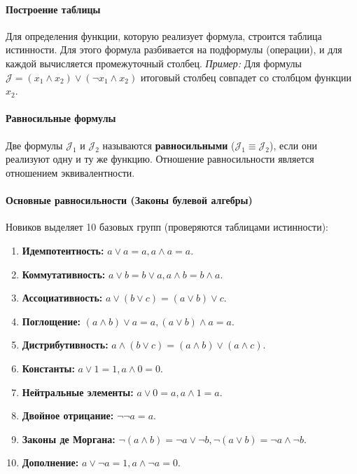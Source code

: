 \paragraph{Построение таблицы}
Для определения функции, которую реализует формула, строится таблица истинности. Для этого формула разбивается на подформулы (операции), и для каждой вычисляется промежуточный столбец.
\textit{Пример:} Для формулы $\mathcal{J} = (x_1 \land x_2) \lor (\neg x_1 \land x_2)$ итоговый столбец совпадет со столбцом функции $x_2$.

\paragraph{Равносильные формулы}
Две формулы $\mathcal{J}_1$ и $\mathcal{J}_2$ называются \textbf{равносильными} ($\mathcal{J}_1 \equiv \mathcal{J}_2$), если они реализуют одну и ту же функцию.
Отношение равносильности является отношением эквивалентности.

\paragraph{Основные равносильности (Законы булевой алгебры)}
Новиков выделяет 10 базовых групп (проверяются таблицами истинности):
\begin{enumerate}
    \item \textbf{Идемпотентность:} $a \lor a = a, a \land a = a$.
    \item \textbf{Коммутативность:} $a \lor b = b \lor a, a \land b = b \land a$.
    \item \textbf{Ассоциативность:} $a \lor (b \lor c) = (a \lor b) \lor c$.
    \item \textbf{Поглощение:} $(a \land b) \lor a = a, (a \lor b) \land a = a$.
    \item \textbf{Дистрибутивность:} $a \land (b \lor c) = (a \land b) \lor (a \land c)$.
    \item \textbf{Константы:} $a \lor 1 = 1, a \land 0 = 0$.
    \item \textbf{Нейтральные элементы:} $a \lor 0 = a, a \land 1 = a$.
    \item \textbf{Двойное отрицание:} $\neg \neg a = a$.
    \item \textbf{Законы де Моргана:} $\neg(a \land b) = \neg a \lor \neg b, \neg(a \lor b) = \neg a \land \neg b$.
    \item \textbf{Дополнение:} $a \lor \neg a = 1, a \land \neg a = 0$.
\end{enumerate}

